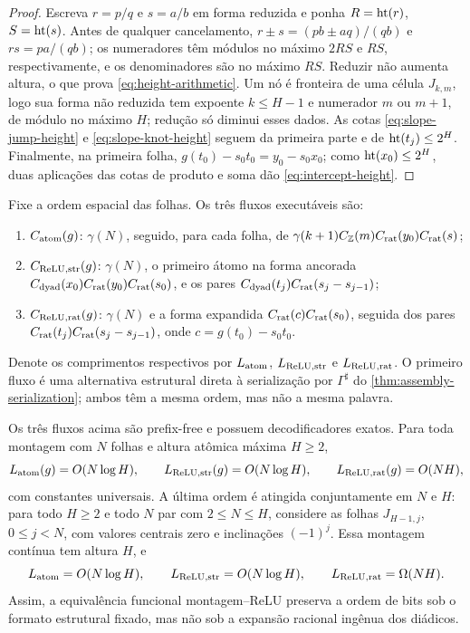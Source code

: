 \begin{proof}
Escreva $r=p/q$ e $s=a/b$ em forma reduzida e ponha
$R=\operatorname{ht}(r)$, $S=\operatorname{ht}(s)$. Antes de qualquer cancelamento,
$r\pm s=(pb\pm aq)/(qb)$ e $rs=pa/(qb)$; os numeradores têm módulos no
máximo $2RS$ e $RS$, respectivamente, e os denominadores são no máximo
$RS$. Reduzir não aumenta altura, o que prova
\eqref{eq:height-arithmetic}. Um nó é fronteira de uma célula
$J_{k,m}$, logo sua forma não reduzida tem expoente $k\le H-1$ e numerador
$m$ ou $m+1$, de módulo no máximo $H$; redução só diminui esses dados. As
cotas \eqref{eq:slope-jump-height} e \eqref{eq:slope-knot-height} seguem da
primeira parte e de $\operatorname{ht}(t_j)\le2^H$. Finalmente, na primeira folha,
$g(t_0)-s_0t_0=y_0-s_0x_0$; como
$\operatorname{ht}(x_0)\le2^H$, duas aplicações das cotas de produto e soma dão
\eqref{eq:intercept-height}.
\end{proof}

Fixe a ordem espacial das folhas. Os três fluxos executáveis são:
\begin{enumerate}[label=(\roman*),leftmargin=2.1em]
 \item $C_{\rm atom}(g)$: $\gamma(N)$, seguido, para cada folha, de
 $\gamma(k+1)C_{\mathbb Z}(m)C_{\rm rat}(y_0)C_{\rm rat}(s)$;
 \item $C_{\rm ReLU,str}(g)$: $\gamma(N)$, o primeiro átomo na forma ancorada
 $C_{\rm dyad}(x_0)C_{\rm rat}(y_0)C_{\rm rat}(s_0)$, e os pares
 $C_{\rm dyad}(t_j)C_{\rm rat}(s_j-s_{j-1})$;
 \item $C_{\rm ReLU,rat}(g)$: $\gamma(N)$ e a forma expandida
 $C_{\rm rat}(c)C_{\rm rat}(s_0)$, seguida dos pares
 $C_{\rm rat}(t_j)C_{\rm rat}(s_j-s_{j-1})$, onde
 $c=g(t_0)-s_0t_0$.
\end{enumerate}
Denote os comprimentos respectivos por $L_{\rm atom}$,
$L_{\rm ReLU,str}$ e $L_{\rm ReLU,rat}$. O primeiro fluxo é uma alternativa
estrutural direta à serialização por $\Gamma^\sharp$ do
\cref{thm:assembly-serialization}; ambos têm a mesma ordem, mas não a mesma
palavra.

\begin{theorem}
\label{thm:coding-formats}
Os três fluxos acima são prefix-free e possuem decodificadores exatos. Para
toda montagem com $N$ folhas e altura atômica máxima $H\ge2$,
\begin{equation}
 L_{\rm atom}(g)=O(N\log H),\qquad
 L_{\rm ReLU,str}(g)=O(N\log H),\qquad
 L_{\rm ReLU,rat}(g)=O(NH),
 \label{eq:coding-format-orders}
\end{equation}
com constantes universais. A última ordem é atingida conjuntamente em $N$ e
$H$: para todo $H\ge2$ e todo $N$ par com $2\le N\le H$, considere as folhas
$J_{H-1,j}$, $0\le j<N$, com valores centrais zero e inclinações $(-1)^j$.
Essa montagem contínua tem altura $H$, e
\begin{equation}
 L_{\rm atom}=O(N\log H),\qquad
 L_{\rm ReLU,str}=O(N\log H),\qquad
 L_{\rm ReLU,rat}=\Omega(NH).
 \label{eq:coding-gap-family}
\end{equation}
Assim, a equivalência funcional montagem--ReLU preserva a ordem de bits sob o
formato estrutural fixado, mas não sob a expansão racional ingênua dos
diádicos.
\end{theorem}

